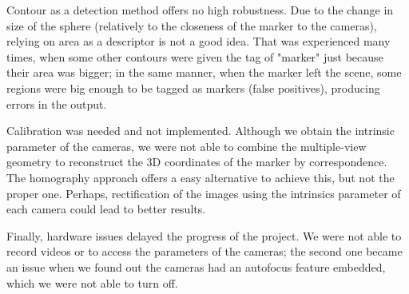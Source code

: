 \documentclass[a4paper,12pt]{article}
\begin{document}
Contour as a detection method offers no high robustness. Due to the change in size of the sphere (relatively to the closeness of the marker to the cameras), relying on area as a descriptor is not a good idea. That was experienced many times, when some other contours were given the tag of "marker" just because their area was bigger; in the same manner, when the marker left the scene, some regions were big enough to be tagged as markers (false positives), producing errors in the output.


Calibration was needed and not implemented. Although we obtain the intrinsic parameter of the cameras, we were not able to combine the multiple-view geometry to reconstruct the 3D coordinates of the marker by correspondence. The homography approach offers a easy alternative to achieve this, but not the proper one. Perhaps, rectification of the images using the intrinsics parameter of each camera could lead to better results.


Finally, hardware issues delayed the progress of the project. We were not able to record videos or to access the parameters of the cameras; the second one became an issue when we found out the cameras had an autofocus feature embedded, which we were not able to turn off.


\nocite{*}





\end{document}
